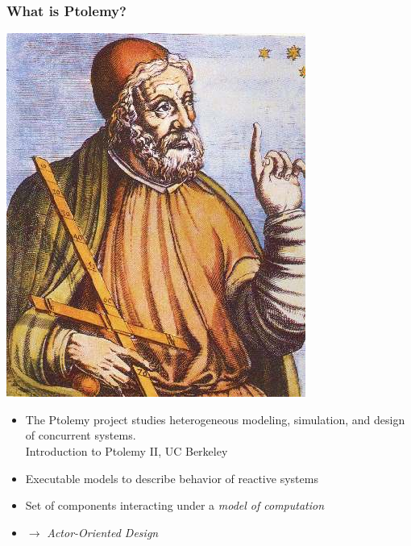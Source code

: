\documentclass{beamer}
\newcommand{\myquote}[1]{\glqq #1\grqq}
\begin{document}
\begin{frame}
  \frametitle{What is Ptolemy?}
  
\begin{center}
\includegraphics[scale=0.20]{images/clausptolemaeus.jpg}
\end{center}
  
\begin{itemize}
	\item \myquote{The Ptolemy project studies heterogeneous modeling, simulation, and design of concurrent systems.}
	\tiny\\\hspace{5cm}Introduction to Ptolemy II, UC Berkeley
 	\pause
 	\small
  \item Executable models to describe behavior of reactive systems
	\pause
	\item Set of components interacting under a \emph{model of computation}
	\pause
	\item $\rightarrow$ \emph{Actor-Oriented Design}
\end{itemize}
  
\end{frame}
\end{document}
